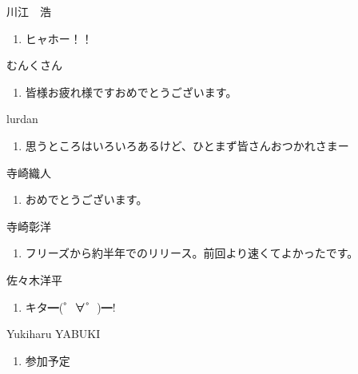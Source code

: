 \documentclass[mingoth,a4paper]{jsarticle}
\begin{document}
\begin{prework}{ 川江　浩 }
  \begin{enumerate}
  \item ヒャホー！！
  \end{enumerate}
\end{prework}

\begin{prework}{ むんくさん }
  \begin{enumerate}
  \item 皆様お疲れ様ですおめでとうございます。
  \end{enumerate}
\end{prework}

\begin{prework}{ lurdan }
  \begin{enumerate}
  \item 思うところはいろいろあるけど、ひとまず皆さんおつかれさまー
  \end{enumerate}
\end{prework}

\begin{prework}{ 寺崎織人 }
  \begin{enumerate}
  \item おめでとうございます。
  \end{enumerate}
\end{prework}

\begin{prework}{ 寺崎彰洋 }
  \begin{enumerate}
  \item フリーズから約半年でのリリース。前回より速くてよかったです。
  \end{enumerate}
\end{prework}

\begin{prework}{ 佐々木洋平 }
  \begin{enumerate}
  \item キタ━(゜∀゜)━!
  \end{enumerate}
\end{prework}

\begin{prework}{ Yukiharu YABUKI }
  \begin{enumerate}
  \item 参加予定
  \end{enumerate}
\end{prework}

\end{document}
